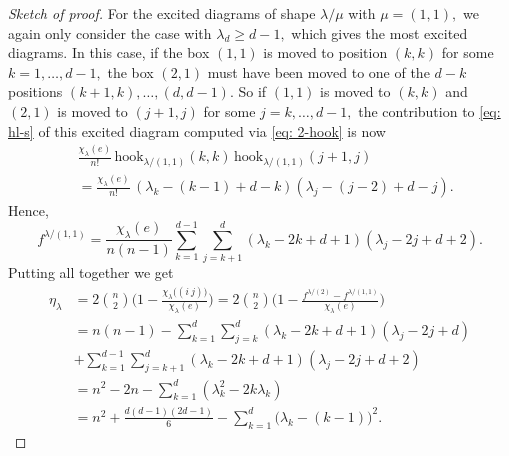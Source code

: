 \documentclass[12pt,dvipsnames,accepted=2016-08-18,a4paper,onecolumn]{quantumarticle}
\renewcommand{\qedsymbol}{\rule[.12ex]{1.2ex}{1.2ex}}
\numberwithin{equation}{section}
\theoremstyle{definition}
\begin{document}
\begin{proof}[Sketch of proof]
For the excited diagrams of shape $\lambda / \mu$ with $\mu = (1,1),$ we again only consider the case with $\lambda_d \geq d-1,$ which gives the most excited diagrams. In this case, if the box $(1,1)$ is moved to position $(k,k)$ for some $k=1,\ldots,d-1,$ the box $(2,1)$ must have been moved to one of the $d-k$ positions $(k+1,k),\ldots,(d,d-1).$
So if $(1,1)$ is moved to $(k,k)$ and $(2,1)$ is moved to $(j+1,j)$ for some $j=k,\ldots,d-1,$ the contribution to \eqref{eq: hl-s} of this excited diagram computed via \eqref{eq: 2-hook} is  now
\begin{align*}
	&\frac{\chi_\lambda(e)}{n!} \, \text{hook}_{\lambda / (1,1)}(k,k)\,\text{hook}_{\lambda / (1,1)}(j+1,j) \\ & =\frac{\chi_\lambda(e)}{n!} \, (\lambda_k-(k-1)+d-k)(\lambda_j-(j-2)+d-j).
\end{align*}
Hence, 
$$
f^{\lambda/(1,1)} = \frac{\chi_\lambda(e)}{n(n-1)}  \sum_{k=1}^{d-1} \sum_{j=k+1}^d (\lambda_k-2k+d+1)(\lambda_j-2j+d+2).
$$
Putting all together we get
\begin{align*}
	\eta_\lambda & = 2 \binom{n}{2} \bigg(1-\frac{\chi_\lambda\big((i\ j)\big)}{\chi_\lambda(e)}\bigg) =
	2 \binom{n}{2} \bigg(1-\frac{f^{\lambda/(2)}-f^{\lambda/(1,1)}}{\chi_\lambda(e)}\bigg)\\ & =
	n(n-1)-\sum_{k=1}^d \sum_{j=k}^d (\lambda_k-2k+d+1)(\lambda_j-2j+d)\\ \phantom{{}={}}  & +
	\sum_{k=1}^{d-1} \sum_{j=k+1}^d(\lambda_k-2k+d+1)(\lambda_j-2j+d+2)\\
& = n^2-2n -\sum_{k=1}^d( \lambda_k^2 - 2 k \lambda_k)\\
& = n^2 +\frac{d(d-1)(2d-1)}{6}
-\sum_{k=1}^d\big( \lambda_k - (k-1)\big)^2.%
\tag*{\qed}
\end{align*}
\renewcommand{\qedsymbol}{}
\end{proof}

	
\end{document}

